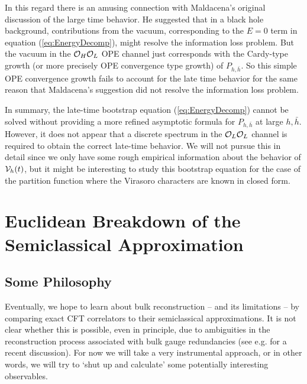 In this regard there is an amusing connection with Maldacena's original discussion \cite{Maldacena:2001kr} of the large time behavior.  He suggested that in a black hole background, contributions from the vacuum, corresponding to the $E=0$ term in equation (\ref{eq:EnergyDecomp}), might resolve the information loss problem.  But the vacuum in the ${\cal O}_H {\cal O}_L$ OPE channel just corresponds with the Cardy-type growth (or more precisely OPE convergence \cite{Pappadopulo:2012jk} type growth) of $P_{h, \bar h}$.  So this simple OPE convergence growth fails to account for the late time behavior for the same reason that Maldacena's suggestion did not resolve the information loss problem.
 
In summary, the late-time bootstrap equation (\ref{eq:EnergyDecomp}) cannot be solved without providing a more refined asymptotic formula for $P_{h, \bar h}$ at large $h, \bar h$.  However, it does not appear that a discrete spectrum in the ${\cal O}_L {\cal O}_L$ channel is required to obtain the correct late-time behavior.  We will not pursue this in detail since we only have some rough empirical information about the behavior of ${\cal V}_h(t)$, but it might be interesting to study this bootstrap equation for the case of the partition function \cite{Dyer:2016pou} where the Virasoro characters are known in closed form.


\section{Euclidean Breakdown of the Semiclassical Approximation}
\label{sec:ForbiddenSingularitiesandReconstruction}

\subsection{Some Philosophy}


Eventually, we hope to learn about bulk reconstruction -- and its limitations -- by comparing exact CFT correlators to their semiclassical approximations.  It is not clear whether this is possible, even in principle, due to ambiguities in the reconstruction process associated with bulk gauge redundancies (see e.g. \cite{Jafferis:2017tiu} for a recent discussion).  For now we will take a very instrumental approach, or in other words, we will try to `shut up and calculate' some potentially interesting observables.  

